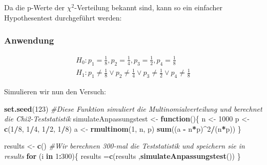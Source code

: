 \documentclass[]{article}
\newenvironment{Shaded}{\begin{snugshade}}{\end{snugshade}}
\newcommand{\CommentTok}[1]{\textcolor[rgb]{0.56,0.35,0.01}{\textit{#1}}}
\newcommand{\ControlFlowTok}[1]{\textcolor[rgb]{0.13,0.29,0.53}{\textbf{#1}}}
\newcommand{\DecValTok}[1]{\textcolor[rgb]{0.00,0.00,0.81}{#1}}
\newcommand{\KeywordTok}[1]{\textcolor[rgb]{0.13,0.29,0.53}{\textbf{#1}}}
\newcommand{\NormalTok}[1]{#1}
\newcommand{\OperatorTok}[1]{\textcolor[rgb]{0.81,0.36,0.00}{\textbf{#1}}}
\newcommand{\StringTok}[1]{\textcolor[rgb]{0.31,0.60,0.02}{#1}}
\begin{document}
Da die p-Werte der \(\chi^2\)-Verteilung bekannt sind, kann so ein einfacher Hypothesentest durchgeführt werden:

\hypertarget{anwendung}{%
\subsubsection{Anwendung}\label{anwendung}}

\[\begin{aligned}H_0: p_1 = \frac18, p_2 = \frac14, p_3 = \frac12, p_4 = \frac18  \\
H_1: p_1 \neq \frac18 \vee p_2 \neq \frac14 \vee p_3 \neq \frac12 \vee p_4 \neq \frac18\end{aligned}\]

Simulieren wir nun den Versuch:

\begin{Shaded}
\begin{Highlighting}[]
\KeywordTok{set.seed}\NormalTok{(}\DecValTok{123}\NormalTok{)}
\CommentTok{#Diese Funktion simuliert die Multinomialverteilung und berechnet die Chi2-Teststatistik}
\NormalTok{simulateAnpassungstest <-}\StringTok{ }\ControlFlowTok{function}\NormalTok{()\{}
\NormalTok{  n <-}\StringTok{ }\DecValTok{1000}
\NormalTok{  p <-}\StringTok{ }\KeywordTok{c}\NormalTok{(}\DecValTok{1}\OperatorTok{/}\DecValTok{8}\NormalTok{, }\DecValTok{1}\OperatorTok{/}\DecValTok{4}\NormalTok{, }\DecValTok{1}\OperatorTok{/}\DecValTok{2}\NormalTok{, }\DecValTok{1}\OperatorTok{/}\DecValTok{8}\NormalTok{)}
\NormalTok{  a <-}\StringTok{ }\KeywordTok{rmultinom}\NormalTok{(}\DecValTok{1}\NormalTok{, n, p)}
  \KeywordTok{sum}\NormalTok{((a }\OperatorTok{-}\StringTok{ }\NormalTok{n}\OperatorTok{*}\NormalTok{p)}\OperatorTok{^}\DecValTok{2}\OperatorTok{/}\NormalTok{(n}\OperatorTok{*}\NormalTok{p))}
\NormalTok{\}}
\end{Highlighting}
\end{Shaded}

\begin{Shaded}
\begin{Highlighting}[]
\NormalTok{results <-}\StringTok{ }\KeywordTok{c}\NormalTok{()}
\CommentTok{#Wir berechnen 300-mal die Teststatistik und speichern sie in results}
\ControlFlowTok{for}\NormalTok{ (i }\ControlFlowTok{in} \DecValTok{1}\OperatorTok{:}\DecValTok{300}\NormalTok{)\{}
\NormalTok{  results =}\KeywordTok{c}\NormalTok{(results ,}\KeywordTok{simulateAnpassungstest}\NormalTok{())}
\NormalTok{\}}
\end{Highlighting}
\end{Shaded}
\end{document}
